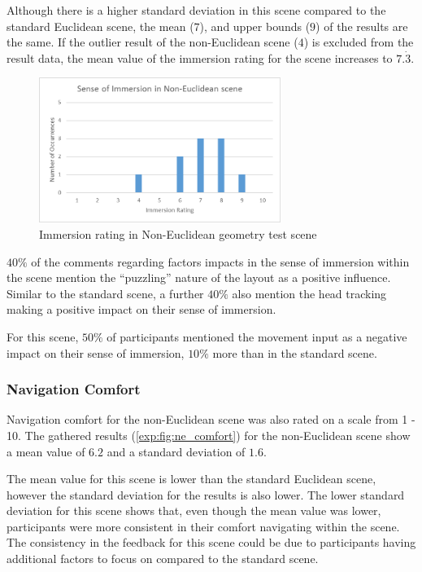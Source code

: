 				Although there is a higher standard deviation in this scene compared to the standard Euclidean scene, the mean ($7$), and upper bounds ($9$) of the results are the same.
				If the outlier result of the non-Euclidean scene ($4$) is excluded from the result data, the mean value of the immersion rating for the scene increases to $7.\dot{3}$.

				\begin{figure}[h]
					\includegraphics[width=0.7\textwidth]{Images/NE_Immersion}
					\centering
					\caption{Immersion rating in Non-Euclidean geometry test scene}
					\label{exp:fig:ne_immersion}
				\end{figure}

				$40\%$ of the comments regarding factors impacts in the sense of immersion within the scene mention the \enquote{puzzling} nature of the layout as a positive influence.
				Similar to the standard scene, a further $40\%$ also mention the head tracking making a positive impact on their sense of immersion.

				For this scene, $50\%$ of participants mentioned the movement input as a negative impact on their sense of immersion, $10\%$ more than in the standard scene.

			\subsubsection{Navigation Comfort}

				Navigation comfort for the non-Euclidean scene was also rated on a scale from 1 - 10.
				The gathered results (\autoref{exp:fig:ne_comfort}) for the non-Euclidean scene show a mean value of $6.2$ and a standard deviation of $1.6$.

				The mean value for this scene is lower than the standard Euclidean scene, however the standard deviation for the results is also lower.
				The lower standard deviation for this scene shows that, even though the mean value was lower, participants were more consistent in their comfort navigating within the scene.
				The consistency in the feedback for this scene could be due to participants having additional factors to focus on compared to the standard scene.

